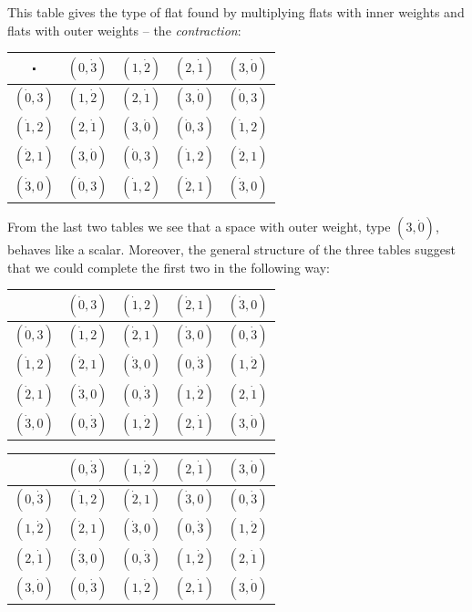 \documentclass[\ifafour a4paper,12pt,\else a5paper,10pt,\fi%
onecolumn,oneside,article,%
british%
]{memoir}
\theoremstyle{remark}
\theoremstyle{innote}
\renewcommand*{\|}{\nonscript\,\vert\nonscript\;\mathopen{}}
\newcommand*{\co}{\centerdot}
\newcommand*{\+}{\boxplus}
\newcommand*{\ywp}{\dot{0}}
\newcommand*{\ywl}{\dot{1}}
\newcommand*{\ywa}{\dot{2}}
\newcommand*{\ywv}{\dot{3}}
\begin{document}
This table gives the type of flat found by multiplying flats with inner
weights and flats with outer weights -- the \emph{contraction}:

{\centering
  \begin{tabular}{c|cccc}
    $\co$& $(0,\ywv)$&$(1,\ywa)$&$(2,\ywl)$&$(3,\ywp)$ \\
    \midrule
    $(\ywp,3)$&$(1,\ywa)$&$(2,\ywl)$&$(3,\ywp)$&$(\ywp,3)$ \\
    $(\ywl,2)$&$(2,\ywl)$&$(3,\ywp)$&$(\ywp,3)$&$(\ywl,2)$ \\
    $(\ywa,1)$&$(3,\ywp)$&$(\ywp,3)$&$(\ywl,2)$&$(\ywa,1)$ \\
    $(\ywv,0)$&$(\ywp,3)$&$(\ywl,2)$&$(\ywa,1)$&$(\ywv,0)$ \\
  \end{tabular}

}

\bigskip

From the last two tables we see that a space with outer weight, type
$(3,\ywp)$, behaves like a scalar. Moreover, the general structure of the
three tables suggest that we could complete the first two in the following
way:

{\centering
  \begin{tabular}{c|cccc}
    & $(\ywp,3)$&$(\ywl,2)$&$(\ywa,1)$&$(\ywv,0)$ \\
    \midrule
    $(\ywp,3)$&$(\ywl,2)$&$(\ywa,1)$&$(\ywv,0)$&$(0,\ywv)$ \\
    $(\ywl,2)$&$(\ywa,1)$&$(\ywv,0)$&$(0,\ywv)$&$(1,\ywa)$ \\
    $(\ywa,1)$&$(\ywv,0)$&$(0,\ywv)$&$(1,\ywa)$&$(2,\ywl)$ \\
    $(\ywv,0)$&$(0,\ywv)$&$(1,\ywa)$&$(2,\ywl)$&$(3,\ywp)$ \\
  \end{tabular}

}

\bigskip
{\centering
  \begin{tabular}{c|cccc}
    & $(0,\ywv)$&$(1,\ywa)$&$(2,\ywl)$&$(3,\ywp)$ \\
    \midrule
    $(0,\ywv)$&$(\ywl,2)$&$(\ywa,1)$&$(\ywv,0)$&$(0,\ywv)$ \\
    $(1,\ywa)$&$(\ywa,1)$&$(\ywv,0)$&$(0,\ywv)$&$(1,\ywa)$ \\
    $(2,\ywl)$&$(\ywv,0)$&$(0,\ywv)$&$(1,\ywa)$&$(2,\ywl)$ \\
    $(3,\ywp)$&$(0,\ywv)$&$(1,\ywa)$&$(2,\ywl)$&$(3,\ywp)$ \\
  \end{tabular}

}
\end{document}
